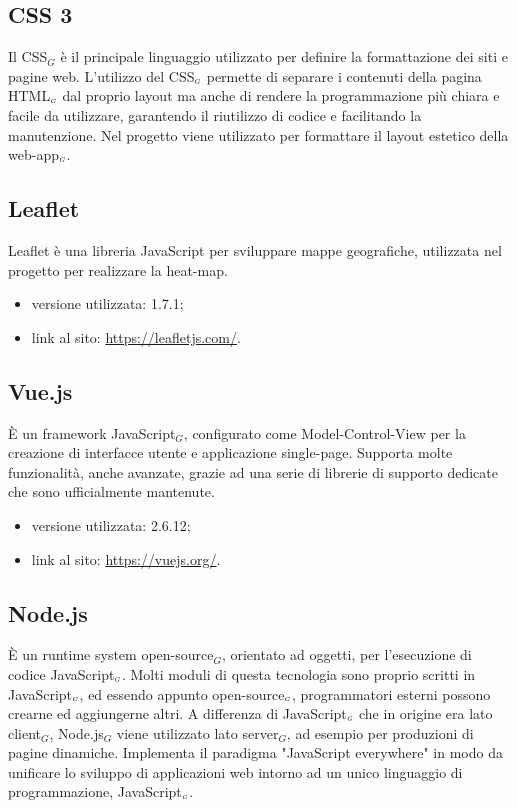 \subsection{CSS 3}\label{TecnologieCSS}
Il CSS$_G$ è il principale linguaggio utilizzato per definire la formattazione dei siti e pagine web.
L'utilizzo del CSS$_{\scaleto{G}{3pt}}$ permette di separare i contenuti della pagina HTML$_{\scaleto{G}{3pt}}$ dal proprio layout ma anche di rendere la programmazione più chiara e facile da utilizzare, garantendo il riutilizzo di codice e facilitando la manutenzione.
Nel progetto viene utilizzato per formattare il layout estetico della web-app$_{\scaleto{G}{3pt}}$.

\subsection{Leaflet} \label{TecnologieLeaflet}
Leaflet è una libreria JavaScript per sviluppare mappe geografiche, utilizzata nel progetto per realizzare la heat-map.
\begin{itemize}
	\item versione utilizzata: 1.7.1;
	\item link al sito: \url{https://leafletjs.com/}.
\end{itemize}


\subsection{Vue.js}\label{TecnologieVue}
È un framework JavaScript$_G$, configurato come Model-Control-View per la creazione di interfacce utente e applicazione single-page.
Supporta molte funzionalità, anche avanzate, grazie ad una serie di librerie di supporto dedicate che sono ufficialmente mantenute.

\begin{itemize}
  \item versione utilizzata: 2.6.12;
  \item link al sito: \url{https://vuejs.org/}.
\end{itemize}

\subsection{Node.js}\label{TecnologieNode}
È un runtime system open-source$_G$, orientato ad oggetti, per l'esecuzione di codice JavaScript$_{\scaleto{G}{3pt}}$.
Molti moduli di questa tecnologia sono proprio scritti in JavaScript$_{\scaleto{G}{3pt}}$, ed essendo appunto open-source$_{\scaleto{G}{3pt}}$, programmatori esterni possono crearne ed aggiungerne altri.
A differenza di JavaScript$_{\scaleto{G}{3pt}}$ che in origine era lato client$_G$, Node.js$_G$ viene utilizzato lato server$_G$, ad esempio per produzioni di pagine dinamiche.
Implementa il paradigma "JavaScript everywhere" in modo da unificare lo sviluppo di applicazioni web intorno ad un unico linguaggio di programmazione, JavaScript$_{\scaleto{G}{3pt}}$.

